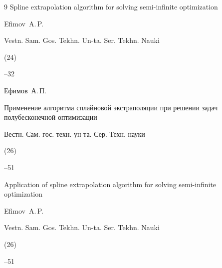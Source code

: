 \begin{thebibliography}{9}
\paper Spline extrapolation algorithm for solving semi-infinite optimization

\by Efimov~A.\,P.

\jour Vestn. Sam. Gos. Tekhn. Un-ta. Ser. Tekhn. Nauki

(24)


--32






\by Ефимов~А.\,П.

\paper Применение алгоритма сплайновой экстраполяции при решении задач полубесконечной оптимизации

\jour Вестн. Сам. гос. техн. ун-та. Сер. Техн. науки

(26)


--51

\misctransl

\paper  Application of spline extrapolation algorithm for solving semi-infinite optimization

\by Efimov~A.\,P.

\jour Vestn. Sam. Gos. Tekhn. Un-ta. Ser. Tekhn. Nauki

(26)


--51



\end{thebibliography}



\noindent

\hskip6.5cm \thedate \par\noindent

\hskip6.5cm\therevdate







\newpage




{}



\makeengtitlem



\renewcommand{\baselinestretch}{0.9}



\newpage

%


%

%

